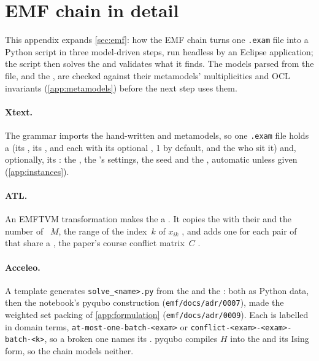 \section{EMF chain in detail}\label{app:emf}

This appendix expands \cref{sec:emf}: how the EMF chain turns one \texttt{.exam} file into a Python
script in three model-driven steps, run headless by an Eclipse application; the script then solves the
 and validates what it finds. The models parsed from the file, and the , are checked
against their metamodels' multiplicities and OCL invariants (\cref{app:metamodels}) before the next step
uses them.

\paragraph{Xtext.} The grammar imports the hand-written  and  metamodels, so one
\texttt{.exam} file holds a  (its , its , and each  with its optional , 1 by
default, and the  who sit it) and, optionally, its : the , the 's
settings, the seed and the , automatic unless given (\cref{app:instances}).

\paragraph{ATL.} An EMFTVM transformation makes the  a  \cite[§5.2, Fig. 3]{Paper}. It
copies the  with their  and the number of ~$M$, the range of the index~$k$ of $x_{ik}$
\cite[§5.3, Eq. (4)]{Paper}, and adds one  for each pair of  that share a , the
paper's course conflict matrix~$C$ \cites[§5.2, Algorithm 1, Eq. (3)]{Paper}[cell 7]{Notebook}.

\paragraph{Acceleo.} A template generates \texttt{solve\_<name>.py} from the  and the
: both as Python data, then the notebook's pyqubo construction
\cites[cells 11--13]{Notebook}{pyqubo} (\texttt{emf/docs/adr/0007}), made the weighted set packing of
\cref{app:formulation} (\texttt{emf/docs/adr/0009}). Each
 is labelled in domain terms, \texttt{at-most-one-batch-<exam>} or
\texttt{conflict-<exam>-<exam>-batch-<k>}, so a broken one names its . pyqubo compiles $H$ into the
 and its Ising form, so the chain models neither.

